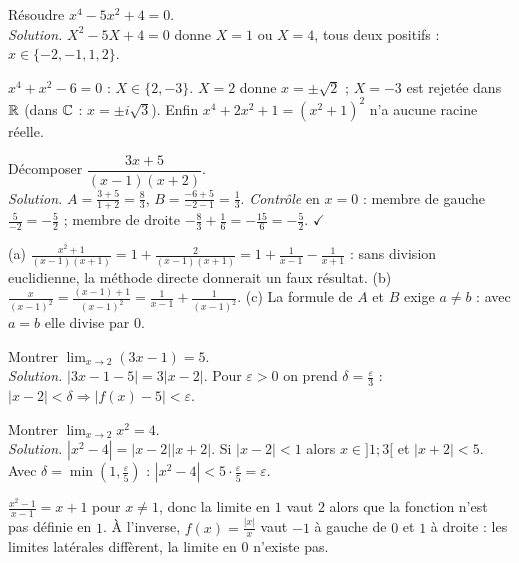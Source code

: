 \begin{exemple}[bicarrée]
Résoudre $x^4-5x^2+4=0$.\\
\emph{Solution.} $X^2-5X+4=0$ donne $X=1$ ou $X=4$, tous deux positifs : $x\in\{-2,-1,1,2\}$.
\end{exemple}
\begin{cas}
$x^4+x^2-6=0$ : $X\in\{2,-3\}$. $X=2$ donne $x=\pm\sqrt2$ ; $X=-3$ est rejetée dans $\mathbb{R}$ (dans $\mathbb{C}$ : $x=\pm i\sqrt3$). Enfin $x^4+2x^2+1=(x^2+1)^2$ n'a aucune racine réelle.
\end{cas}
\begin{exemple}
Décomposer $\dfrac{3x+5}{(x-1)(x+2)}$.\\
\emph{Solution.} $A=\frac{3+5}{1+2}=\frac83$, $B=\frac{-6+5}{-2-1}=\frac13$. \emph{Contrôle} en $x=0$ : membre de gauche $\frac5{-2}=-\frac52$ ; membre de droite $-\frac83+\frac16=-\frac{15}6=-\frac52$. $\checkmark$
\end{exemple}
\begin{cas}
(a) $\frac{x^2+1}{(x-1)(x+1)}=1+\frac2{(x-1)(x+1)}=1+\frac1{x-1}-\frac1{x+1}$ : sans division euclidienne, la méthode directe donnerait un faux résultat. (b) $\frac x{(x-1)^2}=\frac{(x-1)+1}{(x-1)^2}=\frac1{x-1}+\frac1{(x-1)^2}$. (c) La formule de $A$ et $B$ exige $a\ne b$ : avec $a=b$ elle divise par $0$.
\end{cas}
\begin{exemple}
Montrer $\lim_{x\to2}(3x-1)=5$.\\
\emph{Solution.} $|3x-1-5|=3|x-2|$. Pour $\varepsilon>0$ on prend $\delta=\frac\varepsilon3$ : $|x-2|<\delta\Rightarrow|f(x)-5|<\varepsilon$.
\end{exemple}
\begin{exemple}
Montrer $\lim_{x\to2}x^2=4$.\\
\emph{Solution.} $|x^2-4|=|x-2||x+2|$. Si $|x-2|<1$ alors $x\in]1;3[$ et $|x+2|<5$. Avec $\delta=\min(1,\frac\varepsilon5)$ : $|x^2-4|<5\cdot\frac\varepsilon5=\varepsilon$.
\end{exemple}
\begin{cas}
$\frac{x^2-1}{x-1}=x+1$ pour $x\ne1$, donc la limite en $1$ vaut $2$ alors que la fonction n'est pas définie en $1$. À l'inverse, $f(x)=\frac{|x|}x$ vaut $-1$ à gauche de $0$ et $1$ à droite : les limites latérales diffèrent, la limite en $0$ n'existe pas.
\end{cas}

